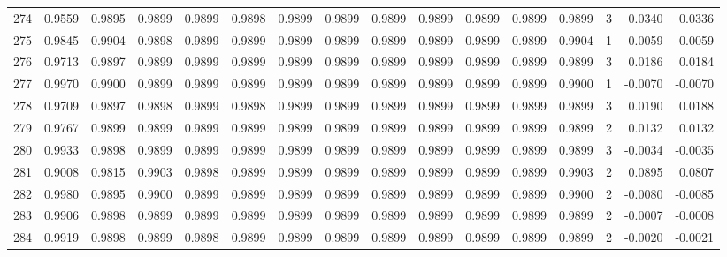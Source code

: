\begin{tabular}{lrrrrrrrrrrrrrrr}
274 &      0.9559 &  0.9895 &  0.9899 &  0.9899 &  0.9898 &  0.9899 &  0.9899 &  0.9899 &  0.9899 &  0.9899 &   0.9899 &     0.9899 &      3 &                    0.0340 &                     0.0336 \\
275 &      0.9845 &  0.9904 &  0.9898 &  0.9899 &  0.9899 &  0.9899 &  0.9899 &  0.9899 &  0.9899 &  0.9899 &   0.9899 &     0.9904 &      1 &                    0.0059 &                     0.0059 \\
276 &      0.9713 &  0.9897 &  0.9899 &  0.9899 &  0.9899 &  0.9899 &  0.9899 &  0.9899 &  0.9899 &  0.9899 &   0.9899 &     0.9899 &      3 &                    0.0186 &                     0.0184 \\
277 &      0.9970 &  0.9900 &  0.9899 &  0.9899 &  0.9899 &  0.9899 &  0.9899 &  0.9899 &  0.9899 &  0.9899 &   0.9899 &     0.9900 &      1 &                   -0.0070 &                    -0.0070 \\
278 &      0.9709 &  0.9897 &  0.9898 &  0.9899 &  0.9898 &  0.9899 &  0.9899 &  0.9899 &  0.9899 &  0.9899 &   0.9899 &     0.9899 &      3 &                    0.0190 &                     0.0188 \\
279 &      0.9767 &  0.9899 &  0.9899 &  0.9899 &  0.9899 &  0.9899 &  0.9899 &  0.9899 &  0.9899 &  0.9899 &   0.9899 &     0.9899 &      2 &                    0.0132 &                     0.0132 \\
280 &      0.9933 &  0.9898 &  0.9899 &  0.9899 &  0.9899 &  0.9899 &  0.9899 &  0.9899 &  0.9899 &  0.9899 &   0.9899 &     0.9899 &      3 &                   -0.0034 &                    -0.0035 \\
281 &      0.9008 &  0.9815 &  0.9903 &  0.9898 &  0.9899 &  0.9899 &  0.9899 &  0.9899 &  0.9899 &  0.9899 &   0.9899 &     0.9903 &      2 &                    0.0895 &                     0.0807 \\
282 &      0.9980 &  0.9895 &  0.9900 &  0.9899 &  0.9899 &  0.9899 &  0.9899 &  0.9899 &  0.9899 &  0.9899 &   0.9899 &     0.9900 &      2 &                   -0.0080 &                    -0.0085 \\
283 &      0.9906 &  0.9898 &  0.9899 &  0.9899 &  0.9899 &  0.9899 &  0.9899 &  0.9899 &  0.9899 &  0.9899 &   0.9899 &     0.9899 &      2 &                   -0.0007 &                    -0.0008 \\
284 &      0.9919 &  0.9898 &  0.9899 &  0.9898 &  0.9899 &  0.9899 &  0.9899 &  0.9899 &  0.9899 &  0.9899 &   0.9899 &     0.9899 &      2 &                   -0.0020 &                    -0.0021 \\

\end{tabular}
